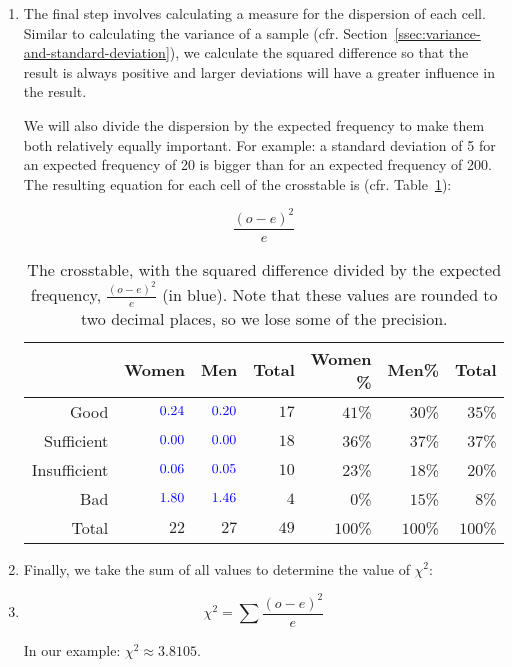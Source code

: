 \begin{enumerate}
  \item The final step involves calculating a measure for the dispersion of each cell. Similar to calculating the variance of a sample (cfr. Section~\ref{ssec:variance-and-standard-deviation}), we calculate the squared difference so that the result is always positive and larger deviations will have a greater influence in the result.

  We will also divide the dispersion by the expected frequency to make them both relatively equally important. For example: a standard deviation of 5 for an expected frequency of 20 is bigger than for an expected frequency of 200. The resulting equation for each cell of the crosstable is (cfr. Table~\ref{tab:crosstable3}):

  \begin{equation}
    \frac{(o - e)^{2}}{e}
  \end{equation}

  \begin{table} \centering
    \begin{tabular}{@{}rrrrrrr@{}}
      \toprule
                &                    Women &                      Men &  Total & Women \% &   Men\% &   Total \\
    	\midrule
           Good & $\textcolor{blue}{0.24}$ & $\textcolor{blue}{0.20}$ &   $17$ &   $41$\% &  $30$\% &  $35$\% \\
     Sufficient & $\textcolor{blue}{0.00}$ & $\textcolor{blue}{0.00}$ &   $18$ &   $36$\% &  $37$\% &  $37$\% \\
   Insufficient & $\textcolor{blue}{0.06}$ & $\textcolor{blue}{0.05}$ &   $10$ &   $23$\% &  $18$\% &  $20$\% \\
            Bad & $\textcolor{blue}{1.80}$ & $\textcolor{blue}{1.46}$ &    $4$ &    $0$\% &  $15$\% &   $8$\% \\
          Total &                     $22$ &                     $27$ &   $49$ &  $100$\% & $100$\% & $100$\% \\
    	\bottomrule
    \end{tabular}
    \caption{The crosstable, with the squared difference divided by the expected frequency, $\frac{(o - e)^2}{e}$ (in blue). Note that these values are rounded to two decimal places, so we lose some of the precision.}
    \label{tab:crosstable3}
  \end{table}

  \item Finally, we take the sum of all values to determine the value of $\chi^{2}$:
  \item 
  \begin{equation}
    \chi^{2} = \sum \frac{(o - e)^{2}}{e}
    \end{equation}
    
    In our example: $\chi^2 \approx 3.8105$.
\end{enumerate}

